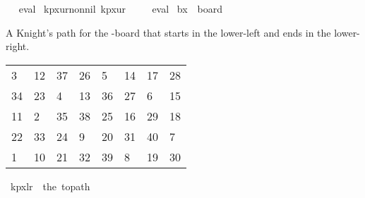 \begin{isabellebody}
\isadelimproof
\ %
\endisadelimproof
%
\isatagproof
{}\isamarkupfalse%
\ eval%
\endisatagproof
{\isafoldproof}%
%
\isadelimproof
%
\endisadelimproof
\isanewline
\isanewline
{}\isamarkupfalse%
\ kp{\isacharunderscore}{\kern0pt}{}x{}{\isacharunderscore}{\kern0pt}ur{\isacharunderscore}{\kern0pt}non{\isacharunderscore}{\kern0pt}nil{\isacharcolon}{\kern0pt}\ {\isachardoublequoteopen}kp{}x{}ur\ {\isasymnoteq}\ {\isacharbrackleft}{\kern0pt}{\isacharbrackright}{\kern0pt}{\isachardoublequoteclose}%
\isadelimproof
\ %
\endisadelimproof
%
\isatagproof
{}\isamarkupfalse%
\ eval%
\endisatagproof
{\isafoldproof}%
%
\isadelimproof
%
\endisadelimproof
\isanewline
\isanewline
{}\isamarkupfalse%
\ {\isachardoublequoteopen}b{}x{}\ {\isasymequiv}\ board\ {}\ {}{\isachardoublequoteclose}%
\begin{isamarkuptext}%
A Knight's path for the -board that starts in the lower-left and ends in the 
lower-right.
  \begin{table}[H]
    \begin{tabular}{llllllll}
       3 & 12 & 37 & 26 &  5 & 14 & 17 & 28 \\
      34 & 23 &  4 & 13 & 36 & 27 &  6 & 15 \\
      11 &  2 & 35 & 38 & 25 & 16 & 29 & 18 \\
      22 & 33 & 24 &  9 & 20 & 31 & 40 &  7 \\
       1 & 10 & 21 & 32 & 39 &  8 & 19 & 30
    \end{tabular}
  \end{table}%
\end{isamarkuptext}\isamarkuptrue%
\isamarkupfalse%
\ {\isachardoublequoteopen}kp{}x{}lr\ {\isasymequiv}\ the\ {\isacharparenleft}{\kern0pt}to{\isacharunderscore}{\kern0pt}path\ \isanewline
\ \ {\isacharbrackleft}{\kern0pt}{\isacharbrackleft}{\kern0pt}{}{\isacharcomma}{\kern0pt}{}{}{\isacharcomma}{\kern0pt}{}{}{\isacharcomma}{\kern0pt}{}{}{\isacharcomma}{\kern0pt}{}{\isacharcomma}{\kern0pt}{}{}{\isacharcomma}{\kern0pt}{}{}{\isacharcomma}{\kern0pt}{}{}{\isacharbrackright}{\kern0pt}{\isacharcomma}{\kern0pt}\isanewline

\end{isabellebody}
